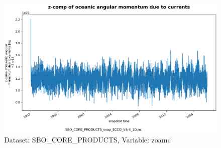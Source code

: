 \begin{figure}[H]
\centering
\includegraphics[scale=0.55]{../images/plots/oneD_plots/SBO_Core_Products/zoamc.png}
\caption{Dataset: SBO\_CORE\_PRODUCTS, Variable: zoamc}
\label{tab:table-SBO_CORE_PRODUCTS_zoamc-Plot}
\end{figure}
\pagebreak
